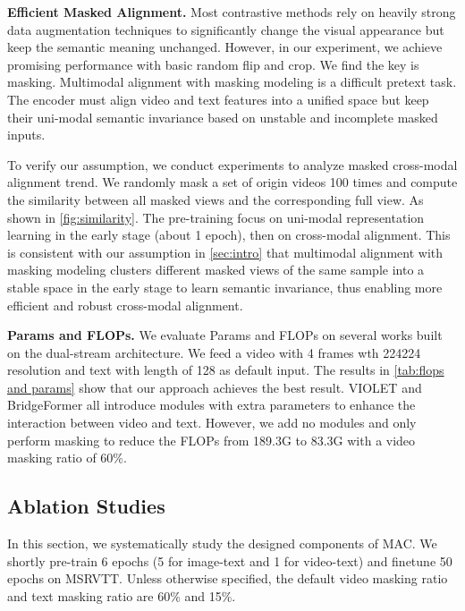 \documentclass[10pt,twocolumn,letterpaper]{article}
\begin{document}
 
\vspace{1mm}\noindent\textbf{Efficient Masked Alignment.} Most contrastive methods rely on heavily strong data augmentation techniques \cite{randaugment, cutout} to significantly change the visual appearance but keep the semantic meaning unchanged. However, in our experiment, we achieve promising performance with basic random flip and crop. We find the key is masking. Multimodal alignment with masking modeling is a difficult pretext task. The encoder must align video and text features into a unified space but keep their uni-modal semantic invariance based on unstable and incomplete masked inputs. 

To verify our assumption, we conduct experiments to analyze masked cross-modal alignment trend. We randomly mask a set of origin videos 100 times and compute the similarity between all masked views and the corresponding full view. As shown in \cref{fig:similarity}. The pre-training focus on uni-modal representation learning in the early stage (about 1 epoch), then on cross-modal alignment. This is consistent with our assumption in \cref{sec:intro} that multimodal alignment with masking modeling clusters different masked views of the same sample into a stable space in the early stage to learn semantic invariance, thus enabling more efficient and robust cross-modal alignment.

\vspace{1mm}\noindent\textbf{Params and FLOPs.} We evaluate Params and FLOPs on several works built on the dual-stream architecture. We feed a video with 4 frames wth 224224 resolution and text with length of 128 as default input. The results in \cref{tab:flops and params} show that our approach achieves the best result. VIOLET and BridgeFormer all introduce modules with extra parameters to enhance the interaction between video and text. However, we add no modules and only perform masking to reduce the FLOPs from 189.3G to 83.3G with a video masking ratio of 60\%.






\vspace{-1mm}\subsection{Ablation Studies}\vspace{-1mm}
\label{sec:abalations}
In this section, we systematically study the designed components of MAC. We shortly pre-train 6 epochs (5 for image-text and 1 for video-text) and finetune 50 epochs on MSRVTT. Unless otherwise specified, the default video masking ratio and text masking ratio are 60\% and 15\%.
\end{document}
